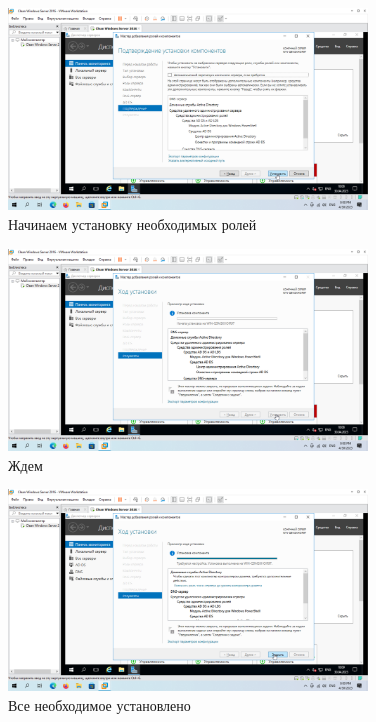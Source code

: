 \documentclass[a4paper]{article}
\begin{document}
  \begin{figure}[H]
    \centering
    \includegraphics[width=0.85\textwidth]{Screenshot_48}
    \caption{Начинаем установку необходимых ролей}
    \label{img:48}
  \end{figure}

  \begin{figure}[H]
    \centering
    \includegraphics[width=0.85\textwidth]{Screenshot_49}
    \caption{Ждем}
    \label{img:49}
  \end{figure}

  \begin{figure}[H]
    \centering
    \includegraphics[width=0.85\textwidth]{Screenshot_50}
    \caption{Все необходимое установлено}
    \label{img:50}
  \end{figure}
\end{document}
